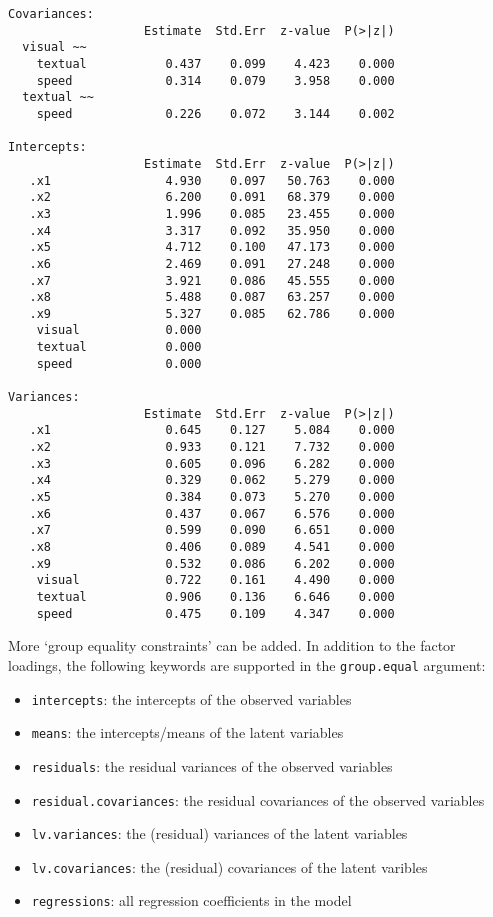 \begin{verbatim}
Covariances:
                   Estimate  Std.Err  z-value  P(>|z|)
  visual ~~                                           
    textual           0.437    0.099    4.423    0.000
    speed             0.314    0.079    3.958    0.000
  textual ~~                                          
    speed             0.226    0.072    3.144    0.002

Intercepts:
                   Estimate  Std.Err  z-value  P(>|z|)
   .x1                4.930    0.097   50.763    0.000
   .x2                6.200    0.091   68.379    0.000
   .x3                1.996    0.085   23.455    0.000
   .x4                3.317    0.092   35.950    0.000
   .x5                4.712    0.100   47.173    0.000
   .x6                2.469    0.091   27.248    0.000
   .x7                3.921    0.086   45.555    0.000
   .x8                5.488    0.087   63.257    0.000
   .x9                5.327    0.085   62.786    0.000
    visual            0.000                           
    textual           0.000                           
    speed             0.000                           

Variances:
                   Estimate  Std.Err  z-value  P(>|z|)
   .x1                0.645    0.127    5.084    0.000
   .x2                0.933    0.121    7.732    0.000
   .x3                0.605    0.096    6.282    0.000
   .x4                0.329    0.062    5.279    0.000
   .x5                0.384    0.073    5.270    0.000
   .x6                0.437    0.067    6.576    0.000
   .x7                0.599    0.090    6.651    0.000
   .x8                0.406    0.089    4.541    0.000
   .x9                0.532    0.086    6.202    0.000
    visual            0.722    0.161    4.490    0.000
    textual           0.906    0.136    6.646    0.000
    speed             0.475    0.109    4.347    0.000
\end{verbatim}

More `group equality constraints' can be added. In addition to the
factor loadings, the following keywords are supported in the
\texttt{group.equal} argument:

\begin{itemize}
\tightlist
\item
  \texttt{intercepts}: the intercepts of the observed variables
\item
  \texttt{means}: the intercepts/means of the latent variables
\item
  \texttt{residuals}: the residual variances of the observed variables
\item
  \texttt{residual.covariances}: the residual covariances of the
  observed variables
\item
  \texttt{lv.variances}: the (residual) variances of the latent
  variables
\item
  \texttt{lv.covariances}: the (residual) covariances of the latent
  varibles
\item
  \texttt{regressions}: all regression coefficients in the model
\end{itemize}

